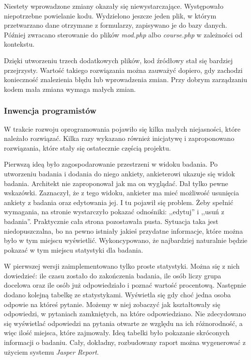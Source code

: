 Niestety wprowadzone zmiany okazały się niewystarczające. Występowało niepotrzebne powielanie kodu. Wydzielono jeszcze jeden plik, w którym przetwarzano dane otrzymane z formularzy, zapisywano je do bazy danych. Później zwracano sterowanie do plików \emph{mod.php} albo \emph{course.php} w zależności od kontekstu.

Dzięki utworzeniu trzech dodatkowych plików, kod źródłowy stał się bardziej przejrzysty. Wartość takiego rozwiązania można zauważyć dopiero, gdy zachodzi konieczność znalezienia błędu lub wprowadzenia zmian. Przy dobrym zarządzaniu kodem mała zmiana wymaga małych zmian.

\subsubsection{Inwencja programistów}

W trakcie rozwoju oprogramowania pojawiło się kilka małych niejasności, które należało rozwiązać. Kilka razy wykazano również inicjatywę i zaproponowano rozwiązania, które stały się ostatecznie częścią projektu.

Pierwszą ideą było zagospodarowanie przestrzeni w widoku badania. Po utworzeniu badania i dodania do niego ankiety, ankieterowi ukazuje się widok badania. Architekt nie zaproponował jak ma on wyglądać. Dał tylko pewne wskazówki. Zaznaczył, że z tego widoku, ankieter ma mieć możliwość usunięcia ankiety z badania oraz edytowania jej. I tu pojawił się problem. Żeby spełnić wymagania, na stronie wystarczyło pokazać odnośniki: ,,edytuj'' i ,,usuń z badania''. Praktycznie cała strona pozostawała pusta. Sytuacja taka jest niedopuszczalna, bo na pewno istniały jakieś przydatne informacje, które można było w tym miejscu wyświetlić. Wykoncypowano, że najbardziej naturalnie będzie pokazać w tym miejscu statystyki dla badania.

W pierwszej wersji zaimplementowano tylko proste statystyki. Można się z nich dowiedzieć: ile czasu zostało do zakończenia badania, ile osób liczy grupa docelowa oraz ile osób już odpowiedziało i poznać wartość procentową. Następnie dodano kolejną tabelkę ze statystykami. Wyświetla się gdy choć jedna osoba odpowie na któreś pytanie. Możemy w niej zobaczyć jak kształtowały się odpowiedzi, w pytaniach zamkniętych, na które odpowiedziano. Nie zdecydowano się wyświetlać odpowiedzi na pytania otwarte ze względu na ich różnorodność, a więc ilość miejsca, które zajmowały. Ideą tabelki było pokazanie skróconych informacji o badaniu. Cały, dokładny, rozbudowany raport można wygenerować z użyciem systemu \emph{Jasper Report}.

